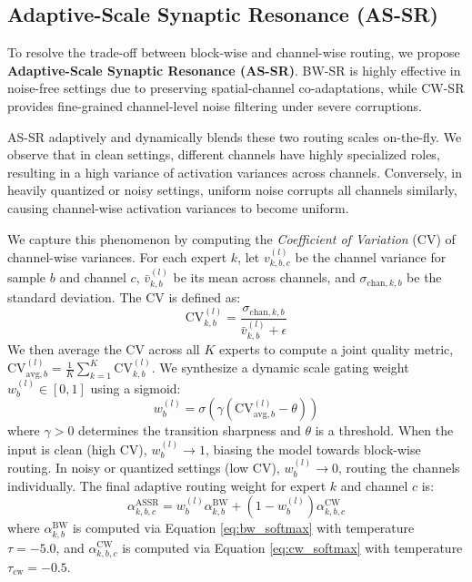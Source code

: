 \documentclass{article}
\theoremstyle{plain}
\theoremstyle{definition}
\theoremstyle{remark}
\begin{document}
\subsection{Adaptive-Scale Synaptic Resonance (AS-SR)}
To resolve the trade-off between block-wise and channel-wise routing, we propose \textbf{Adaptive-Scale Synaptic Resonance (AS-SR)}. BW-SR is highly effective in noise-free settings due to preserving spatial-channel co-adaptations, while CW-SR provides fine-grained channel-level noise filtering under severe corruptions. 

AS-SR adaptively and dynamically blends these two routing scales on-the-fly. We observe that in clean settings, different channels have highly specialized roles, resulting in a high variance of activation variances across channels. Conversely, in heavily quantized or noisy settings, uniform noise corrupts all channels similarly, causing channel-wise activation variances to become uniform.

We capture this phenomenon by computing the \emph{Coefficient of Variation} (CV) of channel-wise variances. For each expert $k$, let $v_{k, b, c}^{(l)}$ be the channel variance for sample $b$ and channel $c$, $\bar{v}_{k, b}^{(l)}$ be its mean across channels, and $\sigma_{\text{chan}, k, b}$ be the standard deviation. The CV is defined as:
\begin{equation}
    \text{CV}_{k, b}^{(l)} = \frac{\sigma_{\text{chan}, k, b}}{\bar{v}_{k, b}^{(l)} + \epsilon}
\end{equation}
We then average the CV across all $K$ experts to compute a joint quality metric, $\text{CV}_{\text{avg}, b}^{(l)} = \frac{1}{K}\sum_{k=1}^K \text{CV}_{k, b}^{(l)}$. We synthesize a dynamic scale gating weight $w_b^{(l)} \in [0, 1]$ using a sigmoid:
\begin{equation}
    w_b^{(l)} = \sigma\left( \gamma \left( \text{CV}_{\text{avg}, b}^{(l)} - \theta \right) \right)
\end{equation}
where $\gamma > 0$ determines the transition sharpness and $\theta$ is a threshold. When the input is clean (high CV), $w_b^{(l)} \to 1$, biasing the model towards block-wise routing. In noisy or quantized settings (low CV), $w_b^{(l)} \to 0$, routing the channels individually.
The final adaptive routing weight for expert $k$ and channel $c$ is:
\begin{equation}
    \alpha^{\text{ASSR}}_{k, b, c} = w_b^{(l)} \alpha^{\text{BW}}_{k, b} + \left(1 - w_b^{(l)}\right) \alpha^{\text{CW}}_{k, b, c}
\label{eq:as_fuse}
\end{equation}
where $\alpha^{\text{BW}}_{k, b}$ is computed via Equation \ref{eq:bw_softmax} with temperature $\tau = -5.0$, and $\alpha^{\text{CW}}_{k, b, c}$ is computed via Equation \ref{eq:cw_softmax} with temperature $\tau_{\text{cw}} = -0.5$.
\end{document}
